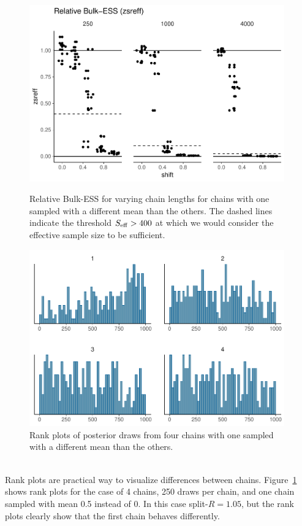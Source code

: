 \documentclass[american,]{article}
\begin{document}
\begin{figure}[tp]
  \centering
  \begin{minipage}{0.48\textwidth}
  \includegraphics[width=0.98\textwidth]{graphics/zsreff-shifted-chain-1.pdf}
  \caption{Relative Bulk-ESS for varying chain lengths for chains with one
    sampled with a different mean than the others. The dashed lines
    indicate the threshold \(S_{\rm eff} > 400\) at which we would
    consider the effective sample size to be sufficient.}
  \label{fig:zsreff-shifted-chain-1}
\end{minipage}
\hfill
  \begin{minipage}{0.48\textwidth}
  \includegraphics[width=0.98\textwidth]{graphics/hist-shifted-chain-1.pdf}
  \caption{Rank plots of posterior draws from four chains with one
    sampled with a different mean than the others.\\~\\}
  \label{fig:hist-shifted-chain-1}
\end{minipage}
\end{figure}
Rank plots are practical way to visualize differences between
chains. Figure~\ref{fig:hist-shifted-chain-1} shows rank plots for the
case of 4 chains, 250 draws per chain, and one chain sampled with mean
0.5 instead of 0. In this case split-\(\widehat{R} = 1.05\), but the
rank plots clearly show that the first chain behaves differently.
\end{document}
